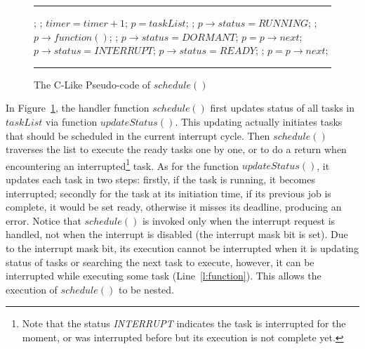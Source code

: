 \documentclass[10pt,journal]{IEEEtran}
\begin{document}
\begin{figure}[!t]
\hrule\vspace{1mm}
  \begin{algorithmic}[1]\small
{}
  \State {};  \label{l:1stline}
  \State {}; \label{l:updatestatus}
  \State $timer = timer + 1$; \label{l:timer} \label{l:inc}
  \State $p = taskList$;
   \label{l:startrun1st}
      \State \Return; \label{l:return}
      \State $p\rightarrow status = \textit{RUNNING}$;
      \State {};  \label{l:endrun1st}
      \State $p\rightarrow function()$;  \label{l:function}
      \State {};
      \State $p\rightarrow status = \textit{DORMANT}$;
    \EndIf
    \State $p = p\rightarrow next$;
  \EndWhile
\EndFunction
{}
     \label{l:startupdate}
      \State $p\rightarrow status = \textit{INTERRUPT}$;
    \EndIf
     
        
        \State $p\rightarrow status = \textit{READY}$;
      \Else {}
  \State {}; 
      \EndIf
    \EndIf \label{l:endupdate}
    \State $p = p\rightarrow next$;
  \EndWhile
\EndFunction
  \end{algorithmic}
\hrule
  \caption{The C-Like Pseudo-code of $schedule()$}
  \label{a:schedule}
\end{figure}

In Figure~\ref{a:schedule}, the handler function $schedule()$ first
updates status of all tasks in $taskList$ via function
$updateStatus()$. This updating actually initiates tasks that should
be scheduled in the current interrupt cycle. Then $schedule()$
traverses the list to execute the ready tasks one by one, or to do a
return when encountering an interrupted\footnote{Note that the status
  \textit{INTERRUPT} indicates the task is interrupted for the moment,
  or was interrupted before but its execution is not complete yet.}
task. As for the function $updateStatus()$, it updates each task in
two steps: firstly, if the task is running, it becomes interrupted;
secondly for the task at its initiation time, if its previous job is
complete, it would be set ready, otherwise it misses its deadline,
producing an error. Notice that $schedule()$ is invoked only when the
interrupt request is handled, not when the interrupt is disabled (the
interrupt mask bit is set). Due to the interrupt mask bit, its
execution cannot be interrupted when it is updating status of tasks or
searching the next task to execute, however, it can be interrupted while
executing some task (Line~\ref{l:function}). This allows the execution
of $schedule()$ to be nested.
\end{document}
